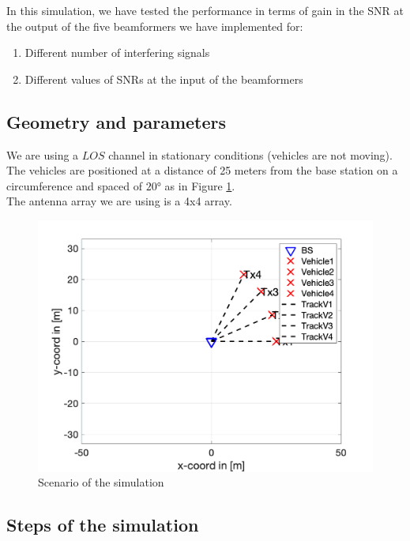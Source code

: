 In this simulation, we have tested the performance in terms of gain in the SNR at the output of the five
 beamformers we have implemented for:

\begin{enumerate}
    \item Different number of interfering signals
    \item Different values of SNRs at the input of the beamformers
\end{enumerate}

\subsection{Geometry and parameters}

We are using a $LOS$ channel in stationary conditions (vehicles are not moving). The vehicles are positioned at a 
distance of 25 meters from the base station on a circumference and spaced of $\ang{20}$ as in Figure \ref{fig:Scenario_circle}. \\ 
The antenna array we are using is a 4x4 array.

\begin{figure}[ht]
    \includegraphics[width=\linewidth]{Scenario_circle.png}
    \caption{Scenario of the simulation}
    \label{fig:Scenario_circle}
\end{figure}

\subsection{Steps of the simulation}

